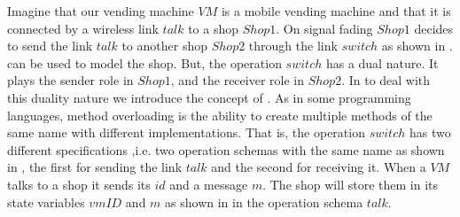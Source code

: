 Imagine that our vending machine $VM$ is a mobile vending machine and that it is connected by a wireless link $talk$ to a shop $Shop1$. On signal fading $Shop1$ decides to send the link $talk$ to another shop $Shop2$ through the link $switch$ as shown in . \oz{} can be used to model the shop. But, the operation $switch$ has a dual nature. It plays the sender role in $Shop1$, and the receiver role in $Shop2$.
 In \oz{} to deal with this duality nature we introduce the concept of . As in some programming languages, method overloading is the ability to create multiple methods of the same name with different implementations. That is, the operation $switch$ has two different specifications ,i.e. two operation schemas with the same name as shown in , the first for sending the link $talk$ and the second for receiving it.
When a $VM$ talks to a shop it sends its $id$ and a message $m$. The shop will store them in its state variables $vmID$ and $m$ as shown in  in the operation schema $talk$.




